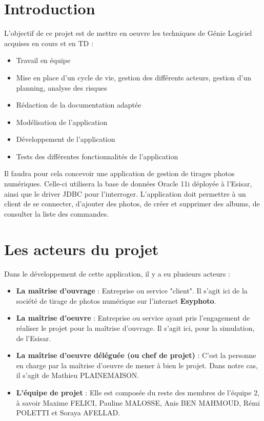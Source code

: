 \documentclass{article}
\begin{document}
\tableofcontents
\newpage
\begin{flushleft}

\section{Introduction}
L'objectif de ce projet est de mettre en oeuvre les techniques de Génie
Logiciel acquises en cours et en TD :
\vspace{1\baselineskip}
\begin{itemize}
  \item Travail en équipe
  \item Mise en place d'un cycle de vie, gestion des différents acteurs,
  gestion d'un planning, analyse des risques
  \item Rédaction de la documentation adaptée
  \item Modélisation de l'application
  \item Développement de l'application
  \item Tests des différentes fonctionnalités de l'application
\end{itemize}
\vspace{1\baselineskip}
Il faudra pour cela concevoir une application de gestion de tirages photos
numériques. Celle-ci utilisera la base de données Oracle 11i déployée à
l'Esisar, ainsi que le driver JDBC pour l'interroger. L'application doit
permettre à un client de se connecter, d'ajouter des photos, de créer et
supprimer des albums, de consulter la liste des commandes.



\section{Les acteurs du projet}
Dans le développement de cette application, il y a eu plusieurs acteurs : \\
\vspace{1\baselineskip}
\begin{itemize}
  \item \textbf{La maîtrise d'ouvrage} : Entreprise ou service "client".
  Il s'agit ici de la société de tirage de photos numérique sur l'internet
  \textbf{Esyphoto}.
  \item \textbf{La maîtrise d'oeuvre} : Entreprise ou service ayant pris
  l'engagement de réaliser le projet pour la maîtrise d'ouvrage. Il s'agit
  ici, pour la simulation, de l'Esisar.
  \item \textbf{La maîtrise d'oeuvre déléguée (ou chef de projet)} : C'est
  la personne en charge par la maîtrise d'oeuvre de mener à bien le projet.
  Dans notre cas, il s'agit
  de Mathieu PLAINEMAISON.
  \item \textbf{L'équipe de projet} : Elle est composée du reste des membres
  de l'équipe 2, à savoir Maxime FELICI, Pauline MALOSSE, Anis BEN MAHMOUD,
  Rémi POLETTI et Soraya AFELLAD.
\end{itemize}
\vspace{1\baselineskip}



\end{flushleft}
\end{document}
